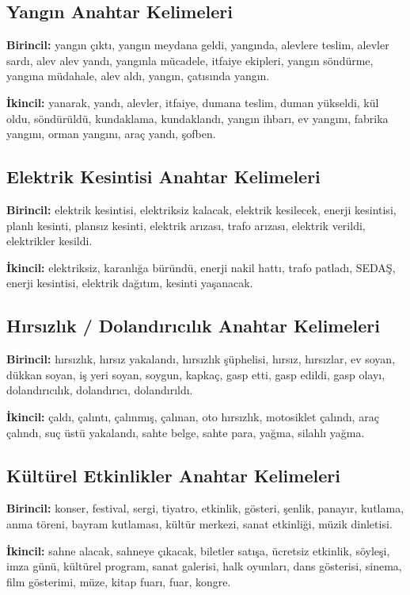 \documentclass[conference,a4paper]{IEEEtran}
\begin{document}
\subsection{Yangın Anahtar Kelimeleri}
\textbf{Birincil:} yangın çıktı, yangın meydana geldi, yangında, alevlere teslim, alevler sardı, alev alev yandı, yangınla mücadele, itfaiye ekipleri, yangın söndürme, yangına müdahale, alev aldı, yangın, çatısında yangın.

\textbf{İkincil:} yanarak, yandı, alevler, itfaiye, dumana teslim, duman yükseldi, kül oldu, söndürüldü, kundaklama, kundaklandı, yangın ihbarı, ev yangını, fabrika yangını, orman yangını, araç yandı, şofben.

\subsection{Elektrik Kesintisi Anahtar Kelimeleri}
\textbf{Birincil:} elektrik kesintisi, elektriksiz kalacak, elektrik kesilecek, enerji kesintisi, planlı kesinti, plansız kesinti, elektrik arızası, trafo arızası, elektrik verildi, elektrikler kesildi.

\textbf{İkincil:} elektriksiz, karanlığa büründü, enerji nakil hattı, trafo patladı, SEDAŞ, enerji kesintisi, elektrik dağıtım, kesinti yaşanacak.

\subsection{Hırsızlık / Dolandırıcılık Anahtar Kelimeleri}
\textbf{Birincil:} hırsızlık, hırsız yakalandı, hırsızlık şüphelisi, hırsız, hırsızlar, ev soyan, dükkan soyan, iş yeri soyan, soygun, kapkaç, gasp etti, gasp edildi, gasp olayı, dolandırıcılık, dolandırıcı, dolandırıldı.

\textbf{İkincil:} çaldı, çalıntı, çalınmış, çalınan, oto hırsızlık, motosiklet çalındı, araç çalındı, suç üstü yakalandı, sahte belge, sahte para, yağma, silahlı yağma.

\subsection{Kültürel Etkinlikler Anahtar Kelimeleri}
\textbf{Birincil:} konser, festival, sergi, tiyatro, etkinlik, gösteri, şenlik, panayır, kutlama, anma töreni, bayram kutlaması, kültür merkezi, sanat etkinliği, müzik dinletisi.

\textbf{İkincil:} sahne alacak, sahneye çıkacak, biletler satışa, ücretsiz etkinlik, söyleşi, imza günü, kültürel program, sanat galerisi, halk oyunları, dans gösterisi, sinema, film gösterimi, müze, kitap fuarı, fuar, kongre.
\end{document}
